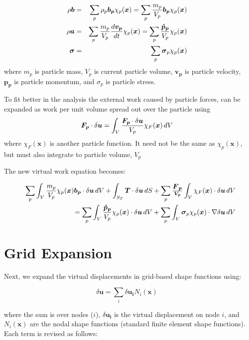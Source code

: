 \documentclass[11pt]{article}
\renewcommand{\vec}[1]{\boldsymbol{#1}}
\newcommand{\tens}[1]{\boldsymbol{\mathsf{#1}}}
\begin{document}
\begin{eqnarray}
    \rho\vec b & = & \sum_p \rho_p \vec{b_p} \chi_p(\vec x) = \sum_p {m_p\over V_p} \vec{b_p}\chi_p(\vec x) \\
    \rho\vec a & = & \sum_p {m_p\over V_p} {d\vec{v_p}\over dt} \chi_p(\vec x) = \sum_p {\vec{\dot p_p}\over V_p} \chi_p(\vec x) \\
    \tens\sigma & = & \sum_p\tens\sigma_p \chi_p(\vec x)
\end{eqnarray}
where $m_p$ is particle mass, $V_p$ is current particle volume, $\vec{v_p}$ is particle velocity, $\vec{p_p}$ is particle momentum, and $\tens\sigma_p$ is particle stress.

To fit better in the analysis the external work caused by particle forces, can be expanded as work per unit volume spread out over the particle using
\begin{equation}
    \vec {F_p} \cdot \delta\vec u =  \int_V {\vec {F_p} \cdot \delta\vec u\over V_p}\chi_F(\vec x)\thinspace dV
\end{equation}
where $\chi_F(\vec x)$ is another particle function. It need not be the same as $\chi_p(\vec x)$, but must also integrate to particle volume, $V_p$

The new virtual work equation becomes:

\begin{eqnarray}
&&\sum_p \int_V {m_p\over V_p} \chi_p(\vec x)\vec{b_p}\cdot \delta\vec u\thinspace dV + \int_{S_T}\vec T \cdot \delta\vec u \thinspace dS + \sum_p \vec {\vec F_p\over V_p} \int_V \chi_F(\vec x) \cdot \delta\vec u\thinspace dV \\
    &&\qquad\qquad
    = \sum_p\int_V {\vec{\dot p_p}\over V_p} \chi_p(\vec x)\cdot \delta\vec u\thinspace dV +  \sum_p\int_V \tens\sigma_p \chi_p(\vec x) \cdot \nabla \delta\vec u\thinspace dV
\end{eqnarray}

\section{Grid Expansion\label{gridexpand}}

Next, we expand the virtual displacements in grid-based shape functions using:

\begin{equation}
     \delta\vec u = \sum_i \delta\vec{u_i} N_i(\vec x)
\end{equation}

\noindent where the sum is over nodes ($i$), $\delta\vec{u_i}$ is the virtual displacement on node $i$, and $N_i(\vec x)$ are the nodal shape functions (standard finite element shape functions). Each term is revised as follows:
\end{document}
